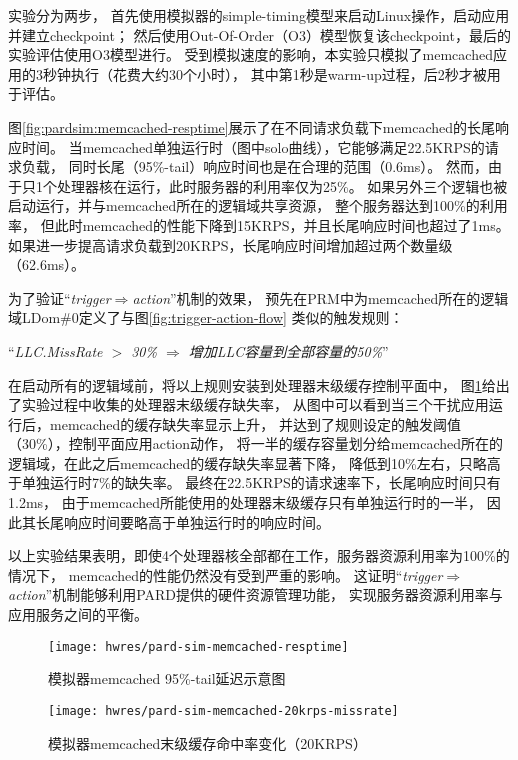 实验分为两步，
首先使用模拟器的simple-timing模型来启动Linux操作，启动应用并建立checkpoint；
然后使用Out-Of-Order（O3）模型恢复该checkpoint，最后的实验评估使用O3模型进行。
受到模拟速度的影响，本实验只模拟了memcached应用的3秒钟执行（花费大约30个小时），
其中第1秒是warm-up过程，后2秒才被用于评估。

图\ref{fig:pardsim:memcached-resptime}展示了在不同请求负载下memcached的长尾响应时间。
当memcached单独运行时（图中solo曲线），它能够满足22.5KRPS的请求负载，
同时长尾（95\%-tail）响应时间也是在合理的范围（0.6ms）。
然而，由于只1个处理器核在运行，此时服务器的利用率仅为25\%。
如果另外三个逻辑也被启动运行，并与memcached所在的逻辑域共享资源，
整个服务器达到100\%的利用率，
但此时memcached的性能下降到15KRPS，并且长尾响应时间也超过了1ms。
如果进一步提高请求负载到20KRPS，长尾响应时间增加超过两个数量级（62.6ms）。

为了验证``\emph{trigger$\Rightarrow$action}''机制的效果，
预先在PRM中为memcached所在的逻辑域LDom\#0定义了与图\ref{fig:trigger-action-flow}
类似的触发规则：

``\emph{LLC.MissRate $>$ 30\% $\Rightarrow$ 增加LLC容量到全部容量的50\%}''

在启动所有的逻辑域前，将以上规则安装到处理器末级缓存控制平面中，
图\ref{fig:pardsim:memcached-20krps-missrate}给出了实验过程中收集的处理器末级缓存缺失率，
从图中可以看到当三个干扰应用运行后，memcached的缓存缺失率显示上升，
并达到了规则设定的触发阈值（30\%），控制平面应用action动作，
将一半的缓存容量划分给memcached所在的逻辑域，在此之后memcached的缓存缺失率显著下降，
降低到10\%左右，只略高于单独运行时7\%的缺失率。
最终在22.5KRPS的请求速率下，长尾响应时间只有1.2ms，
由于memcached所能使用的处理器末级缓存只有单独运行时的一半，
因此其长尾响应时间要略高于单独运行时的响应时间。

以上实验结果表明，即使4个处理器核全部都在工作，服务器资源利用率为100\%的情况下，
memcached的性能仍然没有受到严重的影响。
这证明``\emph{trigger$\Rightarrow$action}''机制能够利用PARD提供的硬件资源管理功能，
实现服务器资源利用率与应用服务之间的平衡。

\begin{figure}[tb]
\begin{minipage}{0.48\textwidth}
  \centering
  \texttt{[image: hwres/pard-sim-memcached-resptime]}
  \caption{模拟器memcached 95\%-tail延迟示意图}
  \label{fig:pardsim:memcached-resptime}
\end{minipage}\hfill
\begin{minipage}{0.48\textwidth}
  \centering
  \texttt{[image: hwres/pard-sim-memcached-20krps-missrate]}
  \caption{模拟器memcached末级缓存命中率变化（20KRPS）}
  \label{fig:pardsim:memcached-20krps-missrate}
\end{minipage}
\end{figure}


